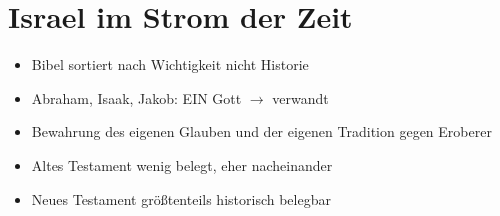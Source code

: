 \documentclass[11pt, paper=a4, twocolumn]{scrartcl}
\begin{document}
	\section{Israel im Strom der Zeit}

	\begin{itemize}
		\item Bibel sortiert nach Wichtigkeit nicht Historie
		\item Abraham, Isaak, Jakob: EIN Gott $\rightarrow$ verwandt
		\item Bewahrung des eigenen Glauben und der eigenen Tradition gegen Eroberer
		\item Altes Testament wenig belegt, eher nacheinander
		\item Neues Testament größtenteils historisch belegbar
	\end{itemize}
\end{document}
